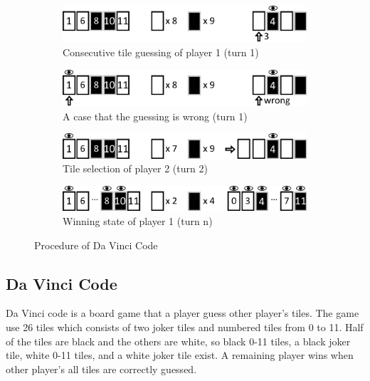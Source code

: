 \documentclass[conference]{IEEEtran}
\begin{document}
\begin{figure}
\begin{subfigure}[b]{0.95\columnwidth}
\label{fig:DVC_procedure_5}
\end{subfigure}
\par\smallskip
\begin{subfigure}[b]{0.95\columnwidth}
\includegraphics[width=0.95\columnwidth]{figures/DVC_procedure_6.pdf}
\caption{Consecutive tile guessing of player 1 (turn 1)}
\label{fig:DVC_procedure_6}
\end{subfigure}
\par\smallskip
\begin{subfigure}[b]{0.95\columnwidth}
\includegraphics[width=0.95\columnwidth]{figures/DVC_procedure_7.pdf}
\caption{A case that the guessing is wrong (turn 1)}
\label{fig:DVC_procedure_7}
\end{subfigure}
\par\smallskip
\begin{subfigure}[b]{0.95\columnwidth}
\includegraphics[width=0.95\columnwidth]{figures/DVC_procedure_8.pdf}
\caption{Tile selection of player 2 (turn 2)}
\label{fig:DVC_procedure_8}
\end{subfigure}
\par\smallskip
\begin{subfigure}[b]{0.95\columnwidth}
\includegraphics[width=0.95\columnwidth]{figures/DVC_procedure_9.pdf}
\caption{Winning state of player 1 (turn n)}
\label{fig:DVC_procedure_9}
\end{subfigure}
\caption{Procedure of Da Vinci Code}
\end{figure}

\subsection{Da Vinci Code} \label{sec:davinci}
Da Vinci code is a board game that a player guess other player's tiles.
The game use 26 tiles which consists of two joker tiles and numbered tiles from 0 to 11. 
Half of the tiles are black and the others are white, so black 0-11 tiles, a black joker tile, white 0-11 tiles, and a white joker tile exist.
A remaining player wins when other player's all tiles are correctly guessed.
\end{document}
